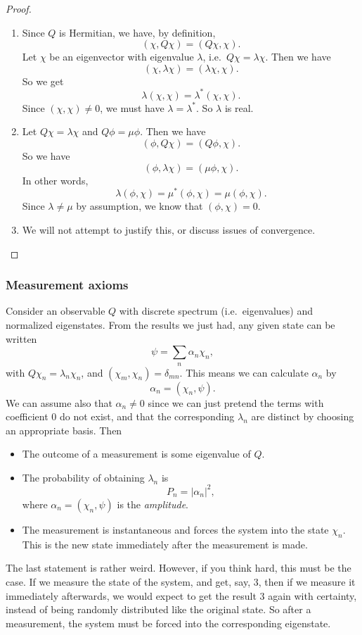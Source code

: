 \documentclass[a4paper]{article}
\begin{document}
\begin{proof}\leavevmode
  \begin{enumerate}
    \item Since $Q$ is Hermitian, we have, by definition,
      \[
        (\chi, Q\chi) = (Q\chi, \chi).
      \]
      Let $\chi$ be an eigenvector with eigenvalue $\lambda$, i.e.\ $Q\chi = \lambda \chi$. Then we have
      \[
        (\chi, \lambda \chi) = (\lambda \chi, \chi).
      \]
      So we get
      \[
        \lambda (\chi, \chi) = \lambda^*(\chi, \chi).
      \]
      Since $(\chi, \chi)\not= 0$, we must have $\lambda = \lambda^*$. So $\lambda$ is real.
    \item Let $Q \chi = \lambda \chi$ and $Q \phi = \mu \phi$. Then we have
      \[
        (\phi, Q\chi) = (Q\phi, \chi).
      \]
      So we have
      \[
        (\phi, \lambda\chi) = (\mu \phi, \chi).
      \]
      In other words,
      \[
        \lambda (\phi, \chi) = \mu^* (\phi, \chi) = \mu (\phi, \chi).
      \]
      Since $\lambda \not= \mu$ by assumption, we know that $(\phi, \chi) = 0$.
    \item We will not attempt to justify this, or discuss issues of convergence.\qedhere
  \end{enumerate}
\end{proof}

\subsubsection*{Measurement axioms}
Consider an observable $Q$ with discrete spectrum (i.e.\ eigenvalues) and normalized eigenstates. From the results we just had, any given state can be written
\[
  \psi = \sum_n \alpha_n \chi_n,
\]
with $Q\chi_n = \lambda_n \chi_n$, and $(\chi_m, \chi_n) = \delta_{mn}$. This means we can calculate $\alpha_n$ by
\[
  \alpha_n = (\chi_n, \psi).
\]
We can assume also that $\alpha_n \not= 0$ since we can just pretend the terms with coefficient $0$ do not exist, and that the corresponding $\lambda_n$ are distinct by choosing an appropriate basis. Then
\begin{itemize}
  \item The outcome of a measurement is some eigenvalue of $Q$.
  \item The probability of obtaining $\lambda_n$ is
    \[
      P_n = |\alpha_n|^2,
    \]
    where $\alpha_n = (\chi_n, \psi)$ is the \emph{amplitude}.
  \item The measurement is instantaneous and forces the system into the state $\chi_n$. This is the new state immediately after the measurement is made.
\end{itemize}
The last statement is rather weird. However, if you think hard, this must be the case. If we measure the state of the system, and get, say, $3$, then if we measure it immediately afterwards, we would expect to get the result $3$ again with certainty, instead of being randomly distributed like the original state. So after a measurement, the system must be forced into the corresponding eigenstate.
\end{document}
